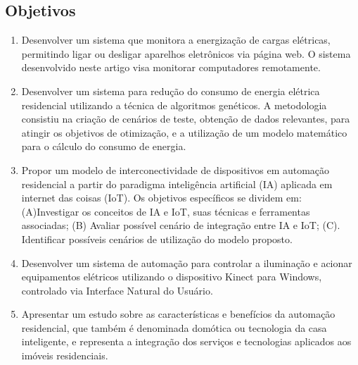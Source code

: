 \documentclass[10pt,brazil,english]{article}
\begin{document}
\subsection{Objetivos}
\begin{enumerate}
\item Desenvolver um sistema que monitora a energização de cargas elétricas, permitindo ligar ou desligar aparelhos eletrônicos via página web. O sistema desenvolvido neste artigo visa monitorar computadores remotamente.
\item Desenvolver um sistema para redução do consumo de energia elétrica residencial utilizando a técnica de algoritmos genéticos. A metodologia consistiu na criação de cenários de teste, obtenção de dados relevantes, para atingir os objetivos de otimização, e a utilização de um modelo matemático para o cálculo do consumo de energia. 
\item Propor um modelo de interconectividade de dispositivos em automação residencial a partir do paradigma inteligência artificial (IA) aplicada em internet das coisas (IoT). Os objetivos específicos se dividem em: (A)Investigar os conceitos de IA e IoT, suas técnicas e ferramentas associadas; (B) Avaliar possível cenário de integração entre IA e IoT; (C). Identificar possíveis cenários de utilização do modelo proposto. 
\item Desenvolver um sistema de automação para controlar a iluminação e acionar equipamentos elétricos utilizando o dispositivo Kinect para Windows, controlado via Interface Natural do Usuário. 
\item Apresentar um estudo sobre as características e benefícios da automação residencial, que também é denominada domótica ou tecnologia da casa inteligente, e representa a integração dos serviços e tecnologias aplicados aos imóveis residenciais.
\end{enumerate}
\end{document}
